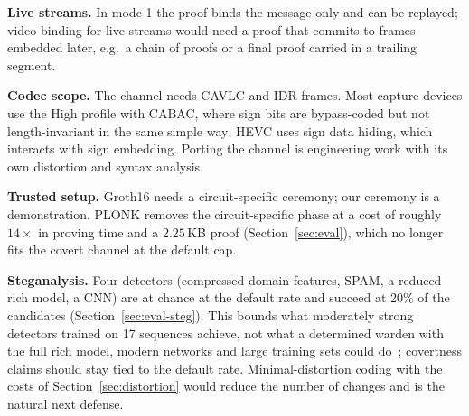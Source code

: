 \textbf{Live streams.} In mode 1 the proof binds the message only and can be replayed; video binding for live streams would need a proof that commits to frames embedded later, e.g.\ a chain of proofs or a final proof carried in a trailing segment.

\textbf{Codec scope.} The channel needs CAVLC and IDR frames. Most capture devices use the High profile with CABAC, where sign bits are bypass-coded but not length-invariant in the same simple way; HEVC uses sign data hiding, which interacts with sign embedding. Porting the channel is engineering work with its own distortion and syntax analysis.

\textbf{Trusted setup.} Groth16 needs a circuit-specific ceremony; our ceremony is a demonstration. PLONK removes the circuit-specific phase at a cost of roughly $14\times$ in proving time and a $2.25$\,KB proof (Section~\ref{sec:eval}), which no longer fits the covert channel at the default cap.

\textbf{Steganalysis.} Four detectors (compressed-domain features, SPAM, a reduced rich model, a CNN) are at chance at the default rate and succeed at 20\% of the candidates (Section~\ref{sec:eval-steg}). This bounds what moderately strong detectors trained on 17 sequences achieve, not what a determined warden with the full rich model, modern networks and large training sets could do~\cite{ker2013realworld}; covertness claims should stay tied to the default rate. Minimal-distortion coding with the costs of Section~\ref{sec:distortion} would reduce the number of changes and is the natural next defense.
